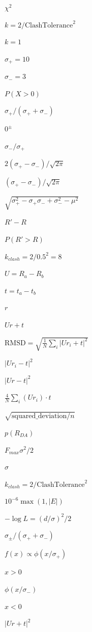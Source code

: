 \documentclass{article}
\begin{document}
$\chi^2$
\pagebreak

$k = 2/\text{ClashTolerance}^2$
\pagebreak

$k = 1$
\pagebreak

$\sigma_+ = 10$
\pagebreak

$\sigma_- = 3$
\pagebreak

$P(X > 0)$
\pagebreak

$\sigma_+/(\sigma_++\sigma_-)$
\pagebreak

$0^\pm$
\pagebreak

$\sigma_-/\sigma_+$
\pagebreak

$2(\sigma_+-\sigma_-)/\sqrt{2\pi}$
\pagebreak

$(\sigma_+-\sigma_-)/\sqrt{2\pi}$
\pagebreak

$\sqrt{\sigma_+^2-\sigma_+\sigma_-+\sigma_-^2 - \mu^2}$
\pagebreak

$R' - R$
\pagebreak

$P(R' > R)$
\pagebreak

$k_{clash} = 2/0.5^2 = 8$
\pagebreak

$U = R_a - R_b$
\pagebreak

$t = t_a - t_b$
\pagebreak

$r$
\pagebreak

$Ur + t$
\pagebreak

$\mathrm{RMSD} = \sqrt{\frac{1}{N}\sum_i |U r_i + t|^2}$
\pagebreak

$|U r_i - t|^2$
\pagebreak

$|Ur - t|^2$
\pagebreak

$\frac{4}{N}\sum_i (U r_i)\cdot t$
\pagebreak

$\sqrt{\text{squared\_deviation} / n}$
\pagebreak

$p(R_{DA})$
\pagebreak

$F_{max}\sigma^2/2$
\pagebreak

$\sigma$
\pagebreak

$k_{clash} = 2/\text{ClashTolerance}^2$
\pagebreak

$10^{-6}\max(1, |E|)$
\pagebreak

$-\log L = (d/\sigma)^2/2$
\pagebreak

$\sigma_\pm/(\sigma_++\sigma_-)$
\pagebreak

$f(x) \propto \phi(x/\sigma_+)$
\pagebreak

$x>0$
\pagebreak

$\phi(x/\sigma_-)$
\pagebreak

$x<0$
\pagebreak

$|Ur + t|^2$
\pagebreak
\end{document}
